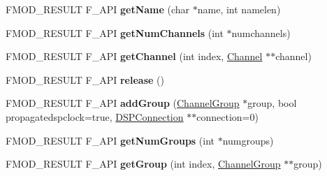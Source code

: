 \begin{DoxyCompactItemize}
\item 
\hypertarget{class_f_m_o_d_1_1_channel_group_a152e3dfbbde9a125c002845e8ffd9231}{F\+M\+O\+D\+\_\+\+R\+E\+S\+U\+L\+T F\+\_\+\+A\+P\+I {\bfseries get\+Name} (char $\ast$name, int namelen)}\label{class_f_m_o_d_1_1_channel_group_a152e3dfbbde9a125c002845e8ffd9231}

\item 
\hypertarget{class_f_m_o_d_1_1_channel_group_a31d5e3b8424b09069841b40633dee207}{F\+M\+O\+D\+\_\+\+R\+E\+S\+U\+L\+T F\+\_\+\+A\+P\+I {\bfseries get\+Num\+Channels} (int $\ast$numchannels)}\label{class_f_m_o_d_1_1_channel_group_a31d5e3b8424b09069841b40633dee207}

\item 
\hypertarget{class_f_m_o_d_1_1_channel_group_aadda005170e610a32c03473499b94823}{F\+M\+O\+D\+\_\+\+R\+E\+S\+U\+L\+T F\+\_\+\+A\+P\+I {\bfseries get\+Channel} (int index, \hyperlink{class_f_m_o_d_1_1_channel}{Channel} $\ast$$\ast$channel)}\label{class_f_m_o_d_1_1_channel_group_aadda005170e610a32c03473499b94823}

\item 
\hypertarget{class_f_m_o_d_1_1_channel_group_a4f7fc3cf21050e3cd5e84f8a2f9a0fc9}{F\+M\+O\+D\+\_\+\+R\+E\+S\+U\+L\+T F\+\_\+\+A\+P\+I {\bfseries release} ()}\label{class_f_m_o_d_1_1_channel_group_a4f7fc3cf21050e3cd5e84f8a2f9a0fc9}

\item 
\hypertarget{class_f_m_o_d_1_1_channel_group_a8f9abbc359b51ed16f8bf158b0d62ba6}{F\+M\+O\+D\+\_\+\+R\+E\+S\+U\+L\+T F\+\_\+\+A\+P\+I {\bfseries add\+Group} (\hyperlink{class_f_m_o_d_1_1_channel_group}{Channel\+Group} $\ast$group, bool propagatedspclock=true, \hyperlink{class_f_m_o_d_1_1_d_s_p_connection}{D\+S\+P\+Connection} $\ast$$\ast$connection=0)}\label{class_f_m_o_d_1_1_channel_group_a8f9abbc359b51ed16f8bf158b0d62ba6}

\item 
\hypertarget{class_f_m_o_d_1_1_channel_group_afa0b87ae5828685c64c1aa921872fd58}{F\+M\+O\+D\+\_\+\+R\+E\+S\+U\+L\+T F\+\_\+\+A\+P\+I {\bfseries get\+Num\+Groups} (int $\ast$numgroups)}\label{class_f_m_o_d_1_1_channel_group_afa0b87ae5828685c64c1aa921872fd58}

\item 
\hypertarget{class_f_m_o_d_1_1_channel_group_a5ac9853233cf3fa367022f1219db26ff}{F\+M\+O\+D\+\_\+\+R\+E\+S\+U\+L\+T F\+\_\+\+A\+P\+I {\bfseries get\+Group} (int index, \hyperlink{class_f_m_o_d_1_1_channel_group}{Channel\+Group} $\ast$$\ast$group)}\label{class_f_m_o_d_1_1_channel_group_a5ac9853233cf3fa367022f1219db26ff}


\end{DoxyCompactItemize}
